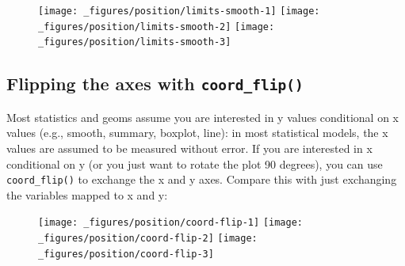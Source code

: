 \begin{figure}[H]
  \texttt{[image: \_figures/position/limits-smooth-1]}%
  \texttt{[image: \_figures/position/limits-smooth-2]}%
  \texttt{[image: \_figures/position/limits-smooth-3]}
\end{figure}

\subsection{\texorpdfstring{Flipping the axes with
\texttt{coord\_flip()}}{Flipping the axes with coord\_flip()}}\label{flipping-the-axes-with-coordux5fflip}

\label{sub:coord-flip}

Most statistics and geoms assume you are interested in y values
conditional on x values (e.g., smooth, summary, boxplot, line): in most
statistical models, the x values are assumed to be measured without
error. If you are interested in x conditional on y (or you just want to
rotate the plot 90 degrees), you can use \texttt{coord\_flip()} to
exchange the x and y axes. Compare this with just exchanging the
variables mapped to x and y: 
 

\begin{Shaded}
\begin{Highlighting}[]
\StringTok{ }
\StringTok{  }\NormalTok{() +}\StringTok{ }
\StringTok{  }\NormalTok{()}
\StringTok{ }
\StringTok{  }\NormalTok{() +}\StringTok{ }
\StringTok{  }\NormalTok{()}
\StringTok{ }
\StringTok{  }\NormalTok{() +}\StringTok{ }
\StringTok{  }\NormalTok{() +}\StringTok{ }
\StringTok{  }\NormalTok{()}
\end{Highlighting}
\end{Shaded}

\begin{figure}[H]
  \texttt{[image: \_figures/position/coord-flip-1]}%
  \texttt{[image: \_figures/position/coord-flip-2]}%
  \texttt{[image: \_figures/position/coord-flip-3]}
\end{figure}


